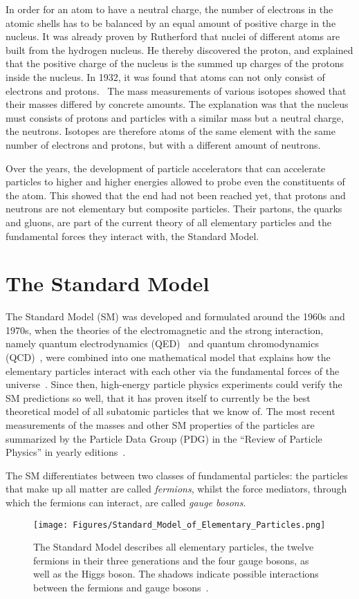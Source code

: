 In order for an atom to have a neutral charge, the number of electrons in the atomic shells has to be balanced by an equal amount of positive charge in the nucleus.
It was already proven by Rutherford that nuclei of different atoms are built from the hydrogen nucleus.
He thereby discovered the proton, and explained that the positive charge of the nucleus is the summed up charges of the protons inside the nucleus.
In 1932, it was found that atoms can not only consist of electrons and protons.~\cite[p. 15]{Griffiths}
The mass measurements of various isotopes showed that their masses differed by concrete amounts.
The explanation was that the nucleus must consists of protons and particles with a similar mass but a neutral charge, the neutrons.
Isotopes are therefore atoms of the same element with the same number of electrons and protons, but with a different amount of neutrons.

Over the years, the development of particle accelerators that can accelerate particles to higher and higher energies allowed to probe even the constituents of the atom.
This showed that the end had not been reached yet, that protons and neutrons are not elementary but composite particles.
Their partons, the quarks and gluons, are part of the current theory of all elementary particles and the fundamental forces they interact with, the Standard Model.

\section{The Standard Model}
\label{StandardModel}
The Standard Model (SM) was developed and formulated around the 1960s and 1970s, when the theories of the electromagnetic and the strong interaction, namely quantum electrodynamics (QED)~\cite{QED,QED2,QED3} and quantum chromodynamics (QCD)~\cite{QCD,QCD2}, were combined into one mathematical model that explains how the elementary particles interact with each other via the fundamental forces of the universe~\cite[p. 3]{Griffiths}.
Since then, high-energy particle physics experiments could verify the SM predictions so well, that it has proven itself to currently be the best theoretical model of all subatomic particles that we know of.
The most recent measurements of the masses and other SM properties of the particles are summarized by the Particle Data Group (PDG) in the ``Review of Particle Physics'' in yearly editions~\cite{PDG}.

The SM differentiates between two classes of fundamental particles: 
the particles that make up all matter are called \textit{fermions}, whilst the force mediators, through which the fermions can interact, are called \textit{gauge bosons}.
\begin{figure}[htbp]
\centering
\texttt{[image: Figures/Standard\_Model\_of\_Elementary\_Particles.png]}
\caption[Table of the elementary particles of the Standard Model]{The Standard Model describes all elementary particles, the twelve fermions in their three generations and the four gauge bosons, as well as the Higgs boson.
The shadows indicate possible interactions between the fermions and gauge bosons~\cite{SM}.}
\label{fig:SM}
\end{figure}

